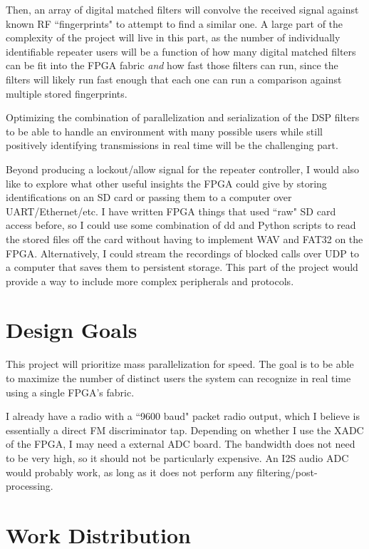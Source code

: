 \documentclass{article}
\begin{document}
Then, an array of digital matched filters will convolve the received signal against known RF ``fingerprints" to attempt to find a similar one. A large part of the complexity of the project will live in this part, as the number of individually identifiable repeater users will be a function of how many digital matched filters can be fit into the FPGA fabric \emph{and} how fast those filters can run, since the filters will likely run fast enough that each one can run a comparison against multiple stored fingerprints.

Optimizing the combination of parallelization and serialization of the DSP filters to be able to handle an environment with many possible users while still positively identifying transmissions in real time will be the challenging part.

Beyond producing a lockout/allow signal for the repeater controller, I would also like to explore what other useful insights the FPGA could give by storing identifications on an SD card or passing them to a computer over UART/Ethernet/etc. I have written FPGA things that used ``raw" SD card access before, so I could use some combination of dd and Python scripts to read the stored files off the card without having to implement WAV and FAT32 on the FPGA. Alternatively, I could stream the recordings of blocked calls over UDP to a computer that saves them to persistent storage. This part of the project would provide a way to include more complex peripherals and protocols.

\section{Design Goals}

This project will prioritize mass parallelization for speed. The goal is to be able to maximize the number of distinct users the system can recognize in real time using a single FPGA's fabric.

I already have a radio with a ``9600 baud" packet radio output, which I believe is essentially a direct FM discriminator tap. Depending on whether I use the XADC of the FPGA, I may need a external ADC board. The bandwidth does not need to be very high, so it should not be particularly expensive. An I2S audio ADC would probably work, as long as it does not perform any filtering/post-processing.

\section{Work Distribution}
\end{document}
